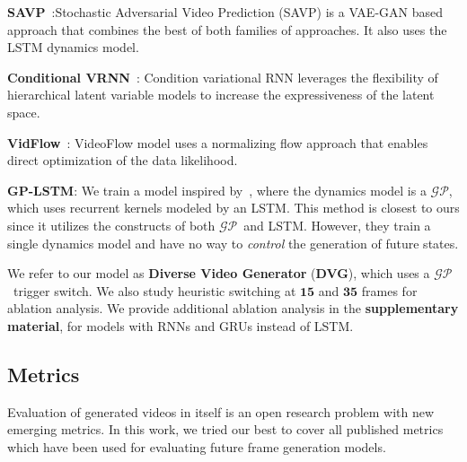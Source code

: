 \documentclass{article} \usepackage{iclr2021_conference,times}
\newcommand{\GP}{$\mathcal{GP}$}
\begin{document}
\noindent\textbf{SAVP}~\citep{lee2018savp}:Stochastic Adversarial Video Prediction (SAVP) is a VAE-GAN based approach that combines the best of both families of approaches. It also uses the LSTM dynamics model.

\noindent\textbf{Conditional VRNN}~\citep{Castrejon:2019}: Condition variational RNN leverages the flexibility of hierarchical latent variable models to increase the expressiveness of the latent space.

\noindent\textbf{VidFlow}~\citep{kumar2019videoflow}: VideoFlow model uses a normalizing flow approach that enables  direct optimization of the data likelihood.

\noindent\textbf{GP-LSTM}: We train a model inspired by~\citep{alshedivat2016learning}, where the dynamics model is a \GP , which uses recurrent kernels modeled by an LSTM. This method is closest to ours since it utilizes the constructs of both \GP\ and LSTM. However, they train a single dynamics model and have no way to \emph{control} the generation of future states. 


We refer to our model as \textbf{Diverse Video Generator} (\textbf{DVG}), which uses a \GP\ trigger switch. We also study heuristic switching at $\textbf{15}$ and $\textbf{35}$ frames for ablation analysis. We provide additional ablation analysis in the \textbf{supplementary material}, for models with RNNs and GRUs instead of LSTM.


\vspace{-0.05in}
\subsection{Metrics}
\vspace{-0.05in}
Evaluation of generated videos in itself is an open research problem with new emerging metrics. In this work, we tried our best to cover all published metrics which have been used for evaluating future frame generation models.
\end{document}
